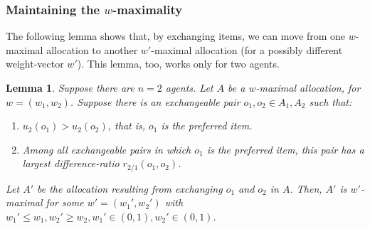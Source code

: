 \documentclass[sigconf]{aamas}
\newtheorem{lemma}[theorem]{Lemma}
\theoremstyle{definition}
\begin{document}
\subsubsection{Maintaining the $w$-maximality}
The following lemma
shows that, by exchanging items, we can move from one $w$-maximal allocation to another $w'$-maximal allocation (for a possibly different weight-vector $w'$).
This lemma, too, works only for two agents.
\begin{lemma}
\label{lem:exchange}
Suppose there are $n=2$ agents.
Let $A$ be a $w$-maximal allocation, for $w=(w_1,w_2)$. Suppose there is an exchangeable pair $o_1, o_2\in A_1, A_2$ such that:
\begin{enumerate}
\item $u_2(o_1)>u_2(o_2)$, that is, $o_1$ is the preferred item.
\item \label{max-cond} Among all exchangeable pairs in which $o_1$ is the preferred item, this pair has a largest difference-ratio $r_{2/1}(o_1,o_2)$.
\end{enumerate}
Let $A'$ be the allocation resulting from exchanging $o_1$ and $o_2$ in $A$.
Then, $A'$ is $w'$-maximal for some $w' = (w_1',w_2')$ with  $w_1'\leq w_1, w_2'\geq w_2, w_1'\in(0,1), w_2'\in(0,1)$.
\end{lemma}
\end{document}
